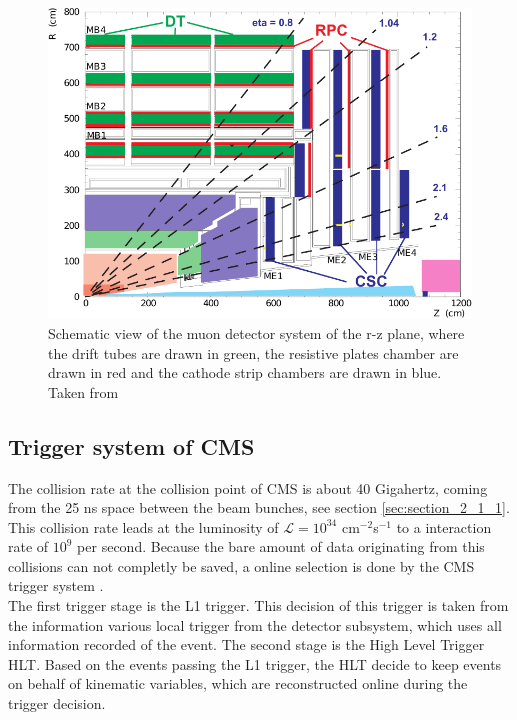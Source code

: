 \begin{figure}[ht]
	\centering
	\includegraphics[width=1\textwidth]{pictures/MUON_SYSTEM.pdf}

	\caption[Muon detector system of CMS]{Schematic view of the muon detector system of the r-z plane, where the drift tubes are drawn in green, the resistive plates chamber are drawn in red and the cathode strip chambers are drawn in blue. Taken from \cite{CMS2}}
	\label{fig:fig_2_10}
\end{figure}


\subsection{Trigger system of \gls{CMS}}

The collision rate at the collision point of \gls{CMS} is about 40 Gigahertz, coming from the 25 ns space between the beam bunches, see section \ref{sec:section_2_1_1}. This collision rate leads at the luminosity of $\mathcal{L} = 10^{34}$ cm$^{-2}$s$^{-1}$ to a interaction rate of $10^9$ per second. Because the bare amount of data originating from this collisions can not completly be saved, a online selection is done by the \gls{CMS} trigger system \cite{CMS2, TRIGGER}. \\

The first trigger stage is the L1 trigger. This decision of this trigger is taken from the information various local trigger from the detector subsystem, which uses all information recorded of the event. The second stage is the High Level Trigger \gls{HLT}. Based on the events passing the L1 trigger, the \gls{HLT} decide to keep events on behalf of kinematic variables, which are reconstructed online during the trigger decision. 

